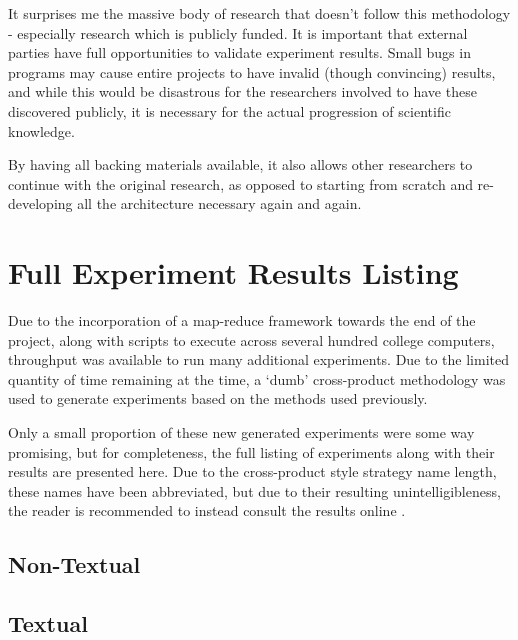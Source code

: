 \documentclass[a4paper,11pt]{report}
\begin{document}
It surprises me the massive body of research that doesn't follow this methodology - especially research which is publicly funded. It is important that external parties have full opportunities to validate experiment results. Small bugs in programs may cause entire projects to have invalid (though convincing) results, and while this would be disastrous for the researchers involved to have these discovered publicly, it is necessary for the actual progression of scientific knowledge.

By having all backing materials available, it also allows other researchers to continue with the original research, as opposed to starting from scratch and re-developing all the architecture necessary again and again.

\section{Full Experiment Results Listing\label{sec:fullresults}}
Due to the incorporation of a map-reduce framework towards the end of the project, along with scripts to execute across several hundred college computers, throughput was available to run many additional experiments. Due to the limited quantity of time remaining at the time, a `dumb' cross-product methodology was used to generate experiments based on the methods used previously. 

Only a small proportion of these new generated experiments were some way promising, but for completeness, the full listing of experiments along with their results are presented here. Due to the cross-product style strategy name length, these names have been abbreviated, but due to their resulting unintelligibleness, the reader is recommended to instead consult the results online \cite{web:projectsourcecode}.

\begin{landscape}
\subsection{Non-Textual}
{\scriptsize {}}
\end{landscape}

\subsection{Textual}
{\footnotesize {}}
\end{document}

